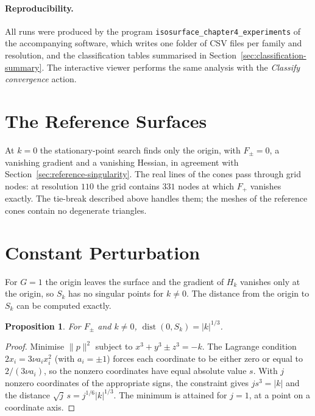 \documentclass[12pt, a4paper, oneside]{book}
\theoremstyle{plain}
\newtheorem{proposition}[theorem]{Proposition}
\theoremstyle{definition}
\theoremstyle{remark}
\begin{document}
\paragraph{Reproducibility.}
All runs were produced by the program \texttt{isosurface\_chapter4\_experiments}
of the accompanying software, which writes one folder of CSV files per family
and resolution, and the classification tables summarised in
Section~\ref{sec:classification-summary}. The interactive viewer performs the
same analysis with the \emph{Classify convergence} action.

\section{The Reference Surfaces}
\label{sec:reference-results}

At $k=0$ the stationary-point search finds only the origin, with
$F_\pm=0$, a vanishing gradient and a vanishing Hessian, in agreement with
Section~\ref{sec:reference-singularity}. The real lines of the cones pass
through grid nodes: at resolution $110$ the grid contains $331$ nodes at which
$F_+$ vanishes exactly. The tie-break described above handles them; the meshes
of the reference cones contain no degenerate triangles.

\section{Constant Perturbation}
\label{sec:constant-perturbation}

For $G=1$ the origin leaves the surface and the gradient of $H_k$ vanishes only
at the origin, so $S_k$ has no singular points for $k\neq0$. The distance from
the origin to $S_k$ can be computed exactly.

\begin{proposition}
\label{prop:constant-distance}
For $F_\pm$ and $k\neq0$, $\operatorname{dist}(0,S_k)=|k|^{1/3}$.
\end{proposition}

\begin{proof}
Minimise $\|p\|^2$ subject to $x^3+y^3\pm z^3=-k$. The Lagrange condition
$2x_i=3\nu a_ix_i^2$ (with $a_i=\pm1$) forces each coordinate to be either zero
or equal to $2/(3\nu a_i)$, so the nonzero coordinates have equal absolute
value $s$. With $j$ nonzero coordinates of the appropriate signs, the
constraint gives $js^3=|k|$ and the distance $\sqrt j\,s=j^{1/6}|k|^{1/3}$. The
minimum is attained for $j=1$, at a point on a coordinate axis.
\end{proof}
\end{document}
